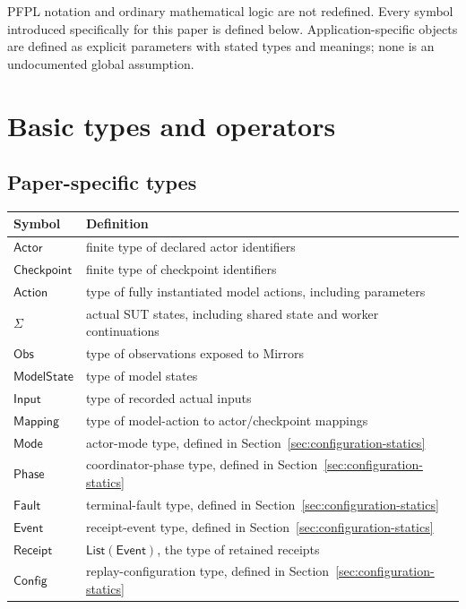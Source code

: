\documentclass{article}
\newcommand{\Actor}{\mathsf{Actor}}
\newcommand{\Checkpoint}{\mathsf{Checkpoint}}
\newcommand{\Action}{\mathsf{Action}}
\newcommand{\State}{\Sigma}
\newcommand{\Obs}{\mathsf{Obs}}
\newcommand{\Model}{\mathsf{ModelState}}
\newcommand{\Input}{\mathsf{Input}}
\newcommand{\Mapping}{\mathsf{Mapping}}
\newcommand{\Mode}{\mathsf{Mode}}
\newcommand{\Phase}{\mathsf{Phase}}
\newcommand{\Fault}{\mathsf{Fault}}
\newcommand{\Event}{\mathsf{Event}}
\newcommand{\Receipt}{\mathsf{Receipt}}
\newcommand{\Config}{\mathsf{Config}}
\begin{document}
PFPL notation and ordinary mathematical logic are not redefined. Every symbol
introduced specifically for this paper is defined below. Application-specific
objects are defined as explicit parameters with stated types and meanings;
none is an undocumented global assumption.

\section{Basic types and operators}

\subsection{Paper-specific types}

\begin{center}
\begin{tabular}{ll}
  Symbol & Definition\\ \hline
  $\Actor$ & finite type of declared actor identifiers\\
  $\Checkpoint$ & finite type of checkpoint identifiers\\
  $\Action$ & type of fully instantiated model actions, including parameters\\
  $\State$ & actual SUT states, including shared state and worker continuations\\
  $\Obs$ & type of observations exposed to Mirrors\\
  $\Model$ & type of model states\\
  $\Input$ & type of recorded actual inputs\\
  $\Mapping$ & type of model-action to actor/checkpoint mappings\\
  $\Mode$ & actor-mode type, defined in Section~\ref{sec:configuration-statics}\\
  $\Phase$ & coordinator-phase type, defined in Section~\ref{sec:configuration-statics}\\
  $\Fault$ & terminal-fault type, defined in Section~\ref{sec:configuration-statics}\\
  $\Event$ & receipt-event type, defined in Section~\ref{sec:configuration-statics}\\
  $\Receipt$ & $\mathsf{List}(\Event)$, the type of retained receipts\\
  $\Config$ & replay-configuration type, defined in Section~\ref{sec:configuration-statics}
\end{tabular}
\end{center}
\end{document}
